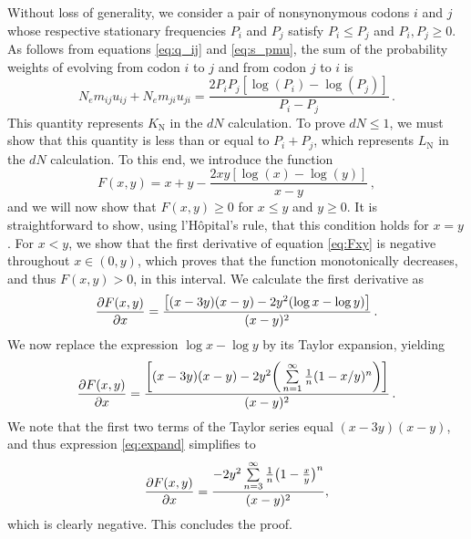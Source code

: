 \documentclass{pnastwo}
\begin{document}
\begin{article}
Without loss of generality, we consider a pair of nonsynonymous codons $i$ and $j$ whose respective stationary frequencies $P_i$ and $P_j$ satisfy $P_i \leq P_j$ and $P_i, P_j \geq 0$. As follows from equations \eqref{eq:q_ij} and \eqref{eq:s_pmu}, the sum of the probability weights of evolving from codon $i$ to $j$ and from codon $j$ to $i$ is
\begin{equation}
N_em_{ij} u_{ij} + N_em_{ji} u_{ji}  = \frac{2P_iP_j[\log(P_i) - \log(P_j)]}{P_i - P_j} \,.
\end{equation}
This quantity represents $K_\text{N}$ in the $dN$ calculation. To prove $dN \leq 1$, we must show that this quantity is less than or equal to $P_i + P_j$, which represents $L_\text{N}$ in the $dN$ calculation. To this end, we introduce the function 
\begin{equation}\label{eq:Fxy}
F(x,y) = x + y - \frac{2xy[\log(x) - \log(y)]}{x - y} \,,
\end{equation}
and we will now show that $F(x,y) \geq 0$ for $x \leq y$ and $y \geq 0 $. It is straightforward to show, using l'H\^{o}pital's rule, that this condition holds for $x=y$. For $x < y$, we show that the first derivative of equation \eqref{eq:Fxy} is negative throughout $x \in (0,y)$, which proves that the function monotonically decreases, and thus $F(x,y) > 0$, in this interval. We calculate the first derivative as 
\begin{equation}
\frac{\partial{F(x,y)}}{\partial{x}} = \frac{\big{[} (x-3y)(x-y) - 2y^2(\log{x} - \log{y}) \big{]}}{(x-y)^2} \,.
\end{equation}
We now replace the expression $\log{x} - \log{y}$ by its Taylor expansion, yielding
\begin{equation}\label{eq:expand}
	\frac{\partial{F(x,y)}}{\partial{x}} = 
	\frac{ \bigg{[} (x-3y)(x-y) - 2y^2\bigg{(}\sum\limits_{n=1}^\infty \frac{1}{n} (1-x/y)^n\bigg{)} \bigg{]}}{(x-y)^2} \,.
\end{equation} We note that the first two terms of the Taylor series equal $(x-3y)(x-y)$, and thus expression \eqref{eq:expand} simplifies to 
\begin{equation}
\frac{\partial{F(x,y)}}{\partial{x}} = \frac{-2y^2\sum\limits_{n=3}^\infty \frac{1}{n} \big{(}1-\frac{x}{y}\big{)}^n}{(x-y)^2} ,
\end{equation}
which is clearly negative. This concludes the proof.


\bigskip




\end{article}
\end{document}

